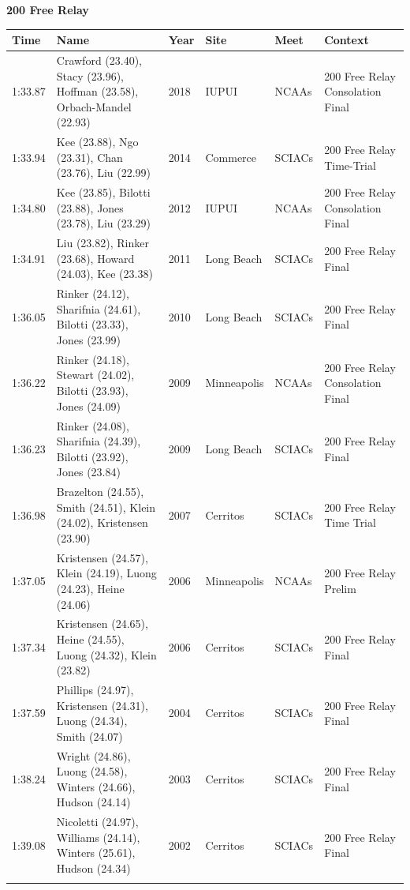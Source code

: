 \noindent\begin{minipage}[t]{0.98\textwidth}
\centering
\textbf{\textcolor{teamprimary}{200 Free Relay}}\par
\vspace{0.5em}
\centering
\small
\renewcommand{\arraystretch}{.75}
\setlength{\tabcolsep}{4pt}
\begin{tabular}{@{}p{2.0cm}p{3.2cm}p{1.2cm}p{2.0cm}p{2.0cm}p{2.5cm}@{}}
\toprule
\textbf{Time} & \textbf{Name} & \textbf{Year} & \textbf{Site} & \textbf{Meet} & \textbf{Context} \\
\midrule
1:33.87 & Crawford (23.40), Stacy (23.96), Hoffman (23.58), Orbach-Mandel (22.93) & 2018 & IUPUI & NCAAs & 200 Free Relay Consolation Final \\
1:33.94 & Kee (23.88), Ngo (23.31), Chan (23.76), Liu (22.99) & 2014 & Commerce & SCIACs & 200 Free Relay Time-Trial \\
1:34.80 & Kee (23.85), Bilotti (23.88), Jones (23.78), Liu (23.29) & 2012 & IUPUI & NCAAs & 200 Free Relay Consolation Final \\
1:34.91 & Liu (23.82), Rinker (23.68), Howard (24.03), Kee (23.38) & 2011 & Long Beach & SCIACs & 200 Free Relay Final \\
1:36.05 & Rinker (24.12), Sharifnia (24.61), Bilotti (23.33), Jones (23.99) & 2010 & Long Beach & SCIACs & 200 Free Relay Final \\
1:36.22 & Rinker (24.18), Stewart (24.02), Bilotti (23.93), Jones (24.09) & 2009 & Minneapolis & NCAAs & 200 Free Relay Consolation Final \\
1:36.23 & Rinker (24.08), Sharifnia (24.39), Bilotti (23.92), Jones (23.84) & 2009 & Long Beach & SCIACs & 200 Free Relay Final \\
1:36.98 & Brazelton (24.55), Smith (24.51), Klein (24.02), Kristensen (23.90) & 2007 & Cerritos & SCIACs & 200 Free Relay Time Trial \\
1:37.05 & Kristensen (24.57), Klein (24.19), Luong (24.23), Heine (24.06) & 2006 & Minneapolis & NCAAs & 200 Free Relay Prelim \\
1:37.34 & Kristensen (24.65), Heine (24.55), Luong (24.32), Klein (23.82) & 2006 & Cerritos & SCIACs & 200 Free Relay Final \\
1:37.59 & Phillips (24.97), Kristensen (24.31), Luong (24.34), Smith (24.07) & 2004 & Cerritos & SCIACs & 200 Free Relay Final \\
1:38.24 & Wright (24.86), Luong (24.58), Winters (24.66), Hudson (24.14) & 2003 & Cerritos & SCIACs & 200 Free Relay Final \\
1:39.08 & Nicoletti (24.97), Williams (24.14), Winters (25.61), Hudson (24.34) & 2002 & Cerritos & SCIACs & 200 Free Relay Final \\
\bottomrule
\vspace{0.5em}
\end{tabular}
\end{minipage}
